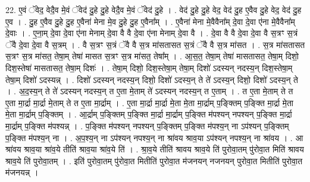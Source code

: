 \documentclass[17pt]{extarticle}
\begin{document}
22. ए॒वं ॅवेद॒ वेदै॒व मे॒वं ॅवेद॑ दु॒हे दु॒हे वेदै॒व मे॒वं ॅवेद॑ दु॒हे । . वेद॑ दु॒हे दु॒हे वेद॒ वेद॑ दु॒ह ए॒वैव दु॒हे वेद॒ वेद॑ दु॒ह ए॒व । . दु॒ह ए॒वैव दु॒हे दु॒ह ए॒वैना॑ मेना मे॒व दु॒हे दु॒ह ए॒वैना᳚म् । . ए॒वैना॑ मेना मे॒वैवैना᳚म् दे॒वा दे॒वा ए॑ना मे॒वैवैना᳚म् दे॒वाः । . ए॒ना॒म् दे॒वा दे॒वा ए॑ना मेनाम् दे॒वा वै वै दे॒वा ए॑ना मेनाम् दे॒वा वै । . दे॒वा वै वै दे॒वा दे॒वा वै स॒त्रꣳ स॒त्रं ॅवै दे॒वा दे॒वा वै स॒त्रम् । . वै स॒त्रꣳ स॒त्रं ॅवै वै स॒त्र मा॑सतासत स॒त्रं ॅवै वै स॒त्र मा॑सत । . स॒त्र मा॑सतासत स॒त्रꣳ स॒त्र मा॑सत॒ तेषा॒म् तेषा॑ मासत स॒त्रꣳ स॒त्र मा॑सत॒ तेषा᳚म् । . आ॒स॒त॒ तेषा॒म् तेषा॑ मासतासत॒ तेषा॒म् दिशो॒ दिश॒स्तेषा॑ मासतासत॒ तेषा॒म् दिशः॑ । . तेषा॒म् दिशो॒ दिश॒स्तेषा॒म् तेषा॒म् दिशो॑ ऽदस्यन् नदस्य॒न् दिश॒स्तेषा॒म् तेषा॒म् दिशो॑ ऽदस्यन्न् । . दिशो॑ ऽदस्यन् नदस्य॒न् दिशो॒ दिशो॑ ऽदस्य॒न् ते ते॑ ऽदस्य॒न् दिशो॒ दिशो॑ ऽदस्य॒न् ते । . अ॒द॒स्य॒न् ते ते॑ ऽदस्यन् नदस्य॒न् त ए॒ता मे॒ताम् ते॑ ऽदस्यन् नदस्य॒न् त ए॒ताम् । . त ए॒ता मे॒ताम् ते त ए॒ता मा॒र्द्रा मा॒र्द्रा मे॒ताम् ते त ए॒ता मा॒र्द्राम् । . ए॒ता मा॒र्द्रा मा॒र्द्रा मे॒ता मे॒ता मा॒र्द्राम् प॒ङ्क्तिम् प॒ङ्क्ति मा॒र्द्रा मे॒ता मे॒ता मा॒र्द्राम् प॒ङ्क्तिम् । . आ॒र्द्राम् प॒ङ्क्तिम् प॒ङ्क्ति मा॒र्द्रा मा॒र्द्राम् प॒ङ्क्ति म॑पश्यन् नपश्यन् प॒ङ्क्ति मा॒र्द्रा मा॒र्द्राम् प॒ङ्क्ति म॑पश्यन्न् । . प॒ङ्क्ति म॑पश्यन् नपश्यन् प॒ङ्क्तिम् प॒ङ्क्ति म॑पश्य॒न् ना ऽप॑श्यन् प॒ङ्क्तिम् प॒ङ्क्ति म॑पश्य॒न् ना । . अ॒प॒श्य॒न् ना ऽप॑श्यन् नपश्य॒न् ना श्रा॑वय श्राव॒या ऽप॑श्यन् नपश्य॒न् ना श्रा॑वय । . आ श्रा॑वय श्राव॒या श्रा॑व॒ये तीति॑ श्राव॒या श्रा॑व॒ये ति॑ । . श्रा॒व॒ये तीति॑ श्रावय श्राव॒ये ति॑ पुरोवा॒तम् पु॑रोवा॒त मिति॑ श्रावय श्राव॒ये ति॑ पुरोवा॒तम् । . इति॑ पुरोवा॒तम् पु॑रोवा॒त मितीति॑ पुरोवा॒त म॑जनयन् नजनयन् पुरोवा॒त मितीति॑ पुरोवा॒त म॑जनयन्न् । \newline
\end{document}
